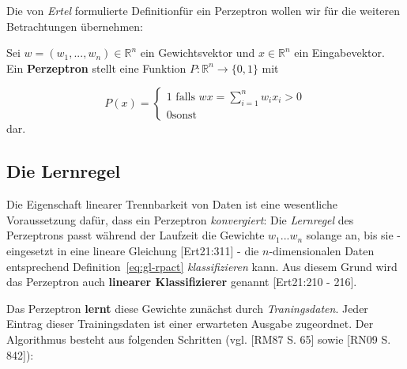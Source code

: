 \noindent
Die von \textit{Ertel} formulierte Definition\footnotemark[22] für ein Perzeptron wollen wir für die weiteren Betrachtungen übernehmen:


\begin{definition}
\noindent
Sei $w = (w_1, ..., w_n) \in  \mathbb{R}^n$ ein Gewichtsvektor und $x \in  \mathbb{R}^n$ ein Eingabevektor. Ein \textbf{Perzeptron} stellt eine Funktion $P:  \mathbb{R}^n \to \{0, 1\}$ mit

\begin{equation}
P(x) = \begin{cases}
            1 \text{ falls } wx = \sum^n_{i=1} w_ix_i >0 \\
            0 \text{sonst}
\end{cases}
\end{equation}
\noindent
dar.

\end{definition}

\subsection{Die Lernregel}\label{lernregel}

Die Eigenschaft linearer Trennbarkeit von Daten ist eine wesentliche Voraussetzung dafür, dass ein Perzeptron \textit{konvergiert}: Die \textit{Lernregel} des Perzeptrons passt während der Laufzeit die Gewichte $w_1 ... w_n$ solange an, bis sie - eingesetzt in eine lineare Gleichung [Ert21:311] - die $n$-dimensionalen Daten entsprechend Definition~\ref{eq:gl-rpact} \textit{klassifizieren} kann.
Aus diesem Grund wird das Perzeptron auch \textbf{linearer Klassifizierer} genannt [Ert21:210 - 216].

Das Perzeptron \textbf{lernt} diese Gewichte zunächst durch \textit{Traningsdaten}\footnotemark[23].
Jeder Eintrag dieser Trainingsdaten ist einer erwarteten Ausgabe zugeordnet. Der Algorithmus besteht aus folgenden Schritten (vgl. [RM87 S. 65] sowie [RN09 S. 842]):



